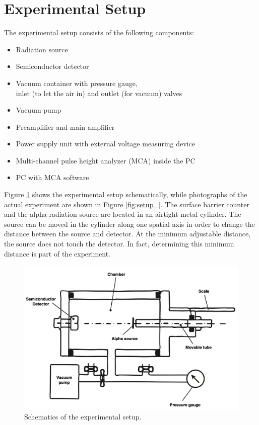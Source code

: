 \clearpage
\section{Experimental Setup}
The experimental setup consists of the following components:
\begin{itemize}
	\item Radiation source
	\item Semiconductor detector
	\item Vacuum container with pressure gauge, \\inlet (to let the air in) and outlet (for vacuum) valves
	\item Vacuum pump
	\item Preamplifier and main amplifier
	\item Power supply unit with external voltage measuring device
	\item Multi-channel pulse height analyzer (MCA) inside the PC
	\item PC with MCA software
\end{itemize}

Figure \ref{fig:aufbauhalbleiter} shows the experimental setup schematically, while photographs of the actual experiment are shown in Figure \ref{fig:setup_}. The surface barrier counter and the alpha radiation source are located in an airtight metal cylinder. The source can be moved in the cylinder along one spatial axis in order to change the distance between the source and detector. At the minimum adjustable distance, the source does not touch the detector. In fact, determining this minimum distance is part of the experiment.
\begin{figure}[h]
	\centering
	\includegraphics[width=0.7\linewidth]{img/schematics_exp.png}
	\caption{Schematics of the experimental setup.}
	\label{fig:aufbauhalbleiter}
\end{figure}


